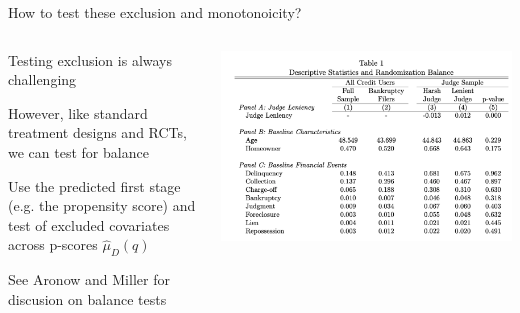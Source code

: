 \documentclass[notes,11pt, aspectratio=169]{beamer}
\newenvironment{wideitemize}{\itemize\addtolength{\itemsep}{10pt}}{\enditemize}
\begin{document}
\begin{frame}{How to test these exclusion and monotonoicity?}
  \begin{columns}[onlytextwidth, T] %
    \begin{column}{.5\textwidth}
      \begin{wideitemize}
      \item Testing exclusion is always challenging
      \item However, like standard treatment designs and RCTs, we can test for balance
      \item Use the predicted first stage (e.g. the propensity score)
        and test of excluded covariates across p-scores $\hat{\mu}_{D}(q)$
      \item See Aronow and Miller for discusion on balance tests
      \end{wideitemize}
    \end{column}%
    \hfill%
    \begin{column}{.5\textwidth}
      \includegraphics[width=\linewidth]{images/dgy_3.png}
    \end{column}%
  \end{columns}
  
\end{frame}
\end{document}

